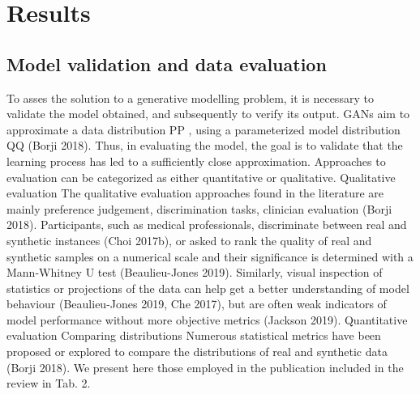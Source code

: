 \section{Results}
\subsection{Model validation and data evaluation}
To asses the solution to a generative modelling problem, it is necessary to validate the model obtained, and subsequently to verify its output. GANs aim to approximate a data distribution PP , using a parameterized model distribution QQ  (Borji 2018). Thus, in evaluating the model, the goal is to validate that the learning process has led to a sufficiently close approximation. Approaches to evaluation can be categorized as either quantitative or qualitative. 
Qualitative evaluation
The qualitative evaluation approaches found in the literature are mainly preference judgement, discrimination tasks, clinician evaluation (Borji 2018). Participants, such as medical professionals, discriminate between real and synthetic instances (Choi 2017b), or asked to rank the quality of real and synthetic samples on a numerical scale and their significance is determined with a Mann-Whitney U test (Beaulieu-Jones 2019). Similarly, visual inspection of statistics or projections of the data can help get a better understanding of model behaviour (Beaulieu-Jones 2019, Che 2017), but are often weak indicators of model performance without more objective  metrics (Jackson 2019). 
Quantitative evaluation
Comparing distributions
Numerous statistical metrics have been proposed or explored to compare the distributions of real and synthetic data (Borji 2018). We present here those employed in the publication included in the review in Tab. 2.




